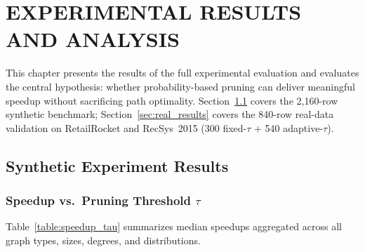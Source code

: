 \chapter{EXPERIMENTAL RESULTS AND ANALYSIS}\label{chap:results}

This chapter presents the results of the full experimental evaluation and evaluates the central hypothesis: whether probability-based pruning can deliver meaningful speedup without sacrificing path optimality. Section~\ref{sec:synth_results} covers the 2,160-row synthetic benchmark; Section~\ref{sec:real_results} covers the 840-row real-data validation on RetailRocket and RecSys~2015 (300 fixed-$\tau$ + 540 adaptive-$\tau$).

\section{Synthetic Experiment Results}\label{sec:synth_results}

\subsection{Speedup vs.\ Pruning Threshold \texorpdfstring{$\tau$}{tau}}\label{sec:speedup_vs_tau}

Table~\ref{table:speedup_tau} summarizes median speedups aggregated across all graph types, sizes, degrees, and distributions.

\begin{table}[htbp]
\centering
\small
\renewcommand{\arraystretch}{1.3}
\caption[Speedup by pruning threshold $\tau$]{Median speedups by pruning threshold $\tau$. ``Wall Spd (all)'' includes rows where the pruned algorithm terminated without finding a path; ``Wall Spd (found)'' is restricted to configurations where a path was returned.}
\label{table:speedup_tau}
\end{table}

